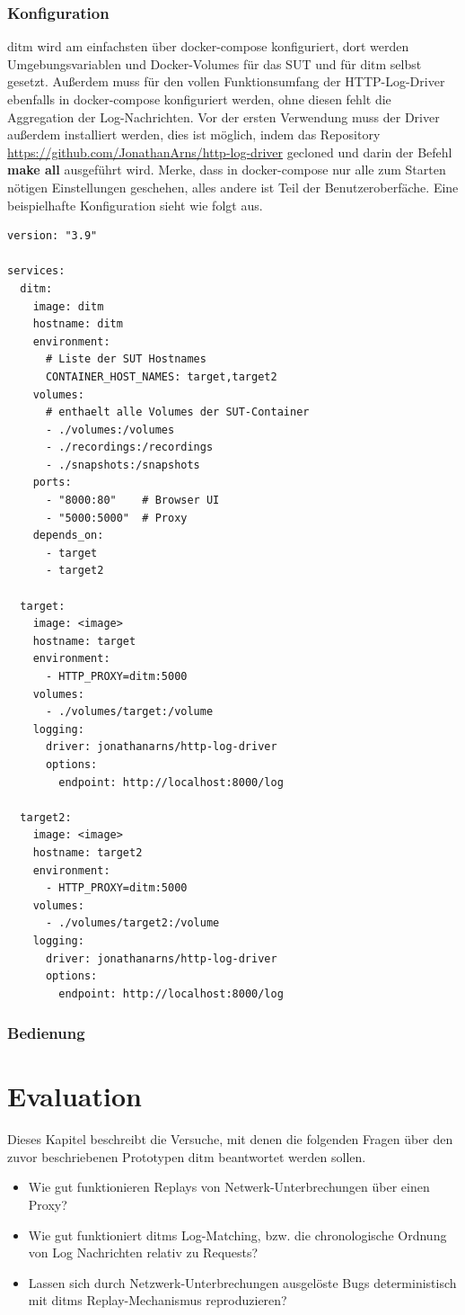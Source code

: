 \documentclass[12pt,a4paper]{report}
\begin{document}
\subsection{Konfiguration}
ditm wird am einfachsten über docker-compose konfiguriert, dort werden Umgebungsvariablen und Docker-Volumes für das SUT und für
ditm selbst gesetzt. Außerdem muss für den vollen Funktionsumfang der HTTP-Log-Driver ebenfalls in docker-compose konfiguriert
werden, ohne diesen fehlt die Aggregation der Log-Nachrichten. Vor der ersten Verwendung muss der Driver außerdem installiert
werden, dies ist möglich, indem das Repository \url{https://github.com/JonathanArns/http-log-driver} gecloned und darin der Befehl
\textbf{make all} ausgeführt wird. Merke, dass in docker-compose nur alle zum Starten nötigen Einstellungen geschehen, alles andere ist Teil
der Benutzeroberfäche. Eine beispielhafte Konfiguration sieht wie folgt aus.
\begin{lstlisting}
version: "3.9"

services:
  ditm:
    image: ditm
    hostname: ditm
    environment:
      # Liste der SUT Hostnames
      CONTAINER_HOST_NAMES: target,target2  
    volumes:
      # enthaelt alle Volumes der SUT-Container
      - ./volumes:/volumes  
      - ./recordings:/recordings
      - ./snapshots:/snapshots
    ports:
      - "8000:80"    # Browser UI
      - "5000:5000"  # Proxy
    depends_on:
      - target
      - target2
  
  target:
    image: <image>
    hostname: target
    environment: 
      - HTTP_PROXY=ditm:5000
    volumes:
      - ./volumes/target:/volume
    logging:
      driver: jonathanarns/http-log-driver
      options:
        endpoint: http://localhost:8000/log

  target2:
    image: <image>
    hostname: target2
    environment: 
      - HTTP_PROXY=ditm:5000
    volumes:
      - ./volumes/target2:/volume
    logging:
      driver: jonathanarns/http-log-driver
      options:
        endpoint: http://localhost:8000/log
\end{lstlisting}

\subsection{Bedienung}

\chapter{Evaluation}
Dieses Kapitel beschreibt die Versuche, mit denen die folgenden Fragen über den zuvor beschriebenen Prototypen ditm beantwortet
werden sollen.
\begin{itemize}
    \item Wie gut funktionieren Replays von Netwerk-Unterbrechungen über einen Proxy?
    \item Wie gut funktioniert ditms Log-Matching, bzw. die chronologische Ordnung von Log Nachrichten relativ zu Requests?
    \item Lassen sich durch Netzwerk-Unterbrechungen ausgelöste Bugs deterministisch mit ditms Replay-Mechanismus reproduzieren?
\end{itemize}
\end{document}
